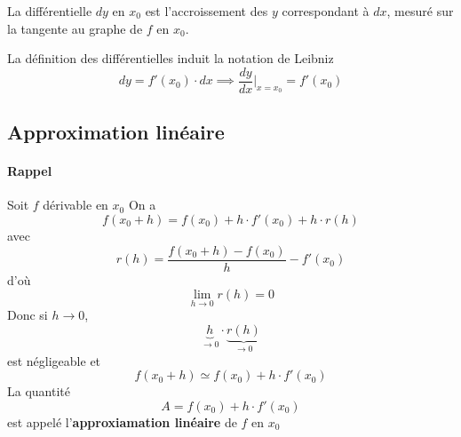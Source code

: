 \documentclass[
    11pt,
    a4paper,
    oneside,
    headinlcude, footinclude,
    twoside,
]{report}
\begin{document}
\begin{itemize}
\begin{center}
        \end{center}

        La différentielle $dy$ en $x_{0}$ est l'accroissement des $y$
        correspondant à $dx$, mesuré sur la tangente au graphe de $f$ en
        $x_{0}$.

        La définition des différentielles induit la notation de Leibniz
        $$dy = f'(x_{0})  \cdot dx \implies \frac{dy}{dx} \Bigr|_{x = x_{0}} =
        f'(x_{0})$$
\end{itemize}

\subsection{Approximation linéaire}
\label{sub:approximation_lineaire}

\paragraph{Rappel}
\label{par:rappel}

Soit $f$ dérivable en $x_{0}$ On a $$f(x_{0} + h) = f(x_{0}) + h \cdot
f'(x_{0}) + h \cdot r(h)$$
avec $$r(h) = \frac{f(x_{0} + h) - f(x_{0})}{h} - f'(x_{0})$$ 
d'où $$ \lim_{h \to 0} r(h) = 0$$
Donc si $h \to 0$, $$\underbrace{h}_{\to 0} \cdot \underbrace{r(h)}_{\to 0}$$
est négligeable et $$f(x_{0} + h) \simeq f(x_{0}) + h \cdot f'(x_{0})$$
La quantité $$A = f(x_{0}) + h \cdot f'(x_{0})$$
est appelé l'\textbf{approxiamation linéaire} de $f$ en $x_{0}$
\end{document}
